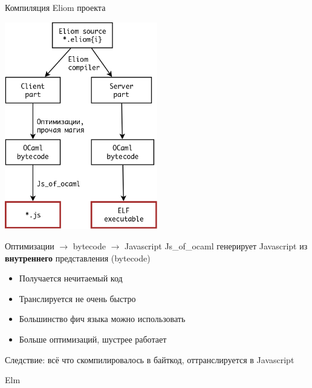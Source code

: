 \documentclass{beamer}
\theoremstyle{definition}
\newcommand{\faGood}{\textcolor{ForestGreen}{\faThumbsUp}}
\newcommand{\faBad}{\textcolor{red}{\faThumbsODown}}
\newcommand{\jsoo}{Js\_of\_ocaml }
\begin{document}
\begin{frame}[fragile]{Компиляция Eliom проекта}
\begin{center}
\includegraphics[width=0.5\textwidth]{compilation2.png}
\end{center}
\end{frame}

\begin{frame}[fragile]{Оптимизации $\rightarrow$ bytecode $\rightarrow$ Javascript}
\jsoo генерирует Javascript из \textbf{внутреннего} представления (bytecode)
\begin{itemize}
 \item[\faBad]  Получается нечитаемый код
 \item[\faBad]  Транслируется не очень быстро
 \pause
 \item[\faGood] Большинство фич языка можно использовать
 \item[\faGood] Больше оптимизаций, шустрее работает \href{https://www.irif.fr/~balat/publications/vouillon_balat-js_of_ocaml.pdf#page=13}
	  {}
\end{itemize}
\vskip5mm
Следствие: всё что скомпилировалось в байткод, оттранслируется в Javascript

\pause
\vskip5mm
Elm \Huge \trollface

\end{frame}
\end{document}

